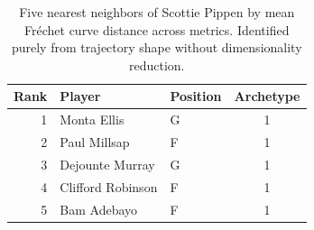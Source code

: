 \begin{table}[htbp]
  \centering\small
  \begin{tabular}{rllc}
    \toprule
    Rank & Player & Position & Archetype \\
    \midrule
    1 & Monta Ellis & G & 1 \\
    2 & Paul Millsap & F & 1 \\
    3 & Dejounte Murray & G & 1 \\
    4 & Clifford Robinson & F & 1 \\
    5 & Bam Adebayo & F & 1 \\
    \bottomrule
  \end{tabular}
  \caption{Five nearest neighbors of Scottie Pippen by mean Fr\'{e}chet curve distance across metrics. Identified purely from trajectory shape without dimensionality reduction.}
  \label{tab:Scottie_Pippen_frechet_curve_neighbors}
\end{table}

